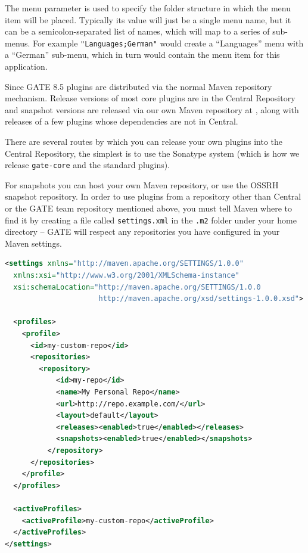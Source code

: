 The menu parameter is used to specify the folder structure in which the menu
item will be placed. Typically its value will just be a single menu name, but
it can be a semicolon-separated list of names, which will map to a series of
sub-menus.  For example \verb!"Languages;German"! would create a ``Languages''
menu with a ``German'' sub-menu, which in turn would contain the menu item
for this application.



Since GATE 8.5 plugins are distributed via the normal Maven repository
mechanism.  Release versions of most core plugins are in the Central
Repository and snapshot versions are released via our own Maven repository at
, along with releases
of a few plugins whose dependencies are not in Central.

There are several routes by which you can release your own plugins into the
Central Repository, the simplest is to use the Sonatype
 system (which is how we release
\verb!gate-core! and the standard plugins).

For snapshots you can host your own Maven repository, or use the OSSRH snapshot
repository.  In order to use plugins from a repository other than Central or
the GATE team repository mentioned above, you must tell Maven where to find it
by creating a file called \verb!settings.xml! in the \verb!.m2! folder under
your home directory -- GATE will respect any repositories you have configured
in your Maven settings.
\begin{lstlisting}[language=XML]
<settings xmlns="http://maven.apache.org/SETTINGS/1.0.0"
  xmlns:xsi="http://www.w3.org/2001/XMLSchema-instance"
  xsi:schemaLocation="http://maven.apache.org/SETTINGS/1.0.0
                      http://maven.apache.org/xsd/settings-1.0.0.xsd">

  <profiles>
    <profile>
      <id>my-custom-repo</id>
      <repositories>
        <repository>
            <id>my-repo</id>
            <name>My Personal Repo</name>
            <url>http://repo.example.com/</url>
            <layout>default</layout>
            <releases><enabled>true</enabled></releases>
            <snapshots><enabled>true</enabled></snapshots>
          </repository>
      </repositories>
    </profile>
  </profiles>

  <activeProfiles>
    <activeProfile>my-custom-repo</activeProfile>
  </activeProfiles>
</settings>
\end{lstlisting}


